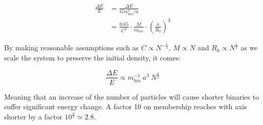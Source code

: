 \begin{align}
\frac{\Delta E}{E} &= \frac{\Delta E}{G m_{bin}^2/a}\\
	&= \frac{0.65}{C^4} \cdot \frac{M}{m_{bin}} \cdot \left( \frac{a}{R_0} \right) ^3 
\end{align}

By making reasonable assumptions such as $C \propto N^{-\frac{1}{3}}$, $ M \propto N$ and $R_0 \propto N^{\frac{1}{3}}$ as we scale the system to preserve the initial density, it comes:

\begin{equation}
\frac{\Delta E}{E} \propto m_{bin}^{-1} ~ a^3 ~ N^{\frac{4}{3}} 
\end{equation}

Meaning that an increase of the number of particles will cause shorter binaries to suffer significant energy change. A factor 10 on membership reaches with axis shorter by a factor $10^{\frac{4}{9}} \simeq 2.8$.